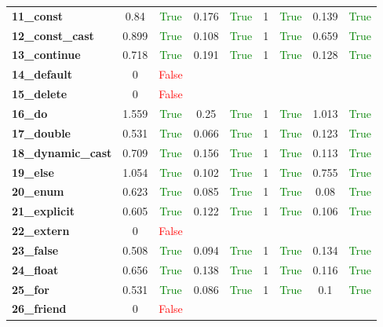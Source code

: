 \documentclass{article}
\begin{document}
\begin{xltabular}{\textwidth}{lcccccccc}
\textbf{11\_const}& 0.84&\textcolor{green}{True}& 0.176&\textcolor{green}{True}& 1&\textcolor{green}{True}& 0.139&\textcolor{green}{True} \\[0.5ex]
\textbf{12\_const\_cast}& 0.899&\textcolor{green}{True}& 0.108&\textcolor{green}{True}& 1&\textcolor{green}{True}& 0.659&\textcolor{green}{True} \\[0.5ex]
\textbf{13\_continue}& 0.718&\textcolor{green}{True}& 0.191&\textcolor{green}{True}& 1&\textcolor{green}{True}& 0.128&\textcolor{green}{True} \\[0.5ex]
\textbf{14\_default}& 0&\textcolor{red}{False} \\[0.5ex]
\textbf{15\_delete}& 0&\textcolor{red}{False} \\[0.5ex]
\textbf{16\_do}& 1.559&\textcolor{green}{True}& 0.25&\textcolor{green}{True}& 1&\textcolor{green}{True}& 1.013&\textcolor{green}{True} \\[0.5ex]
\textbf{17\_double}& 0.531&\textcolor{green}{True}& 0.066&\textcolor{green}{True}& 1&\textcolor{green}{True}& 0.123&\textcolor{green}{True} \\[0.5ex]
\textbf{18\_dynamic\_cast}& 0.709&\textcolor{green}{True}& 0.156&\textcolor{green}{True}& 1&\textcolor{green}{True}& 0.113&\textcolor{green}{True} \\[0.5ex]
\textbf{19\_else}& 1.054&\textcolor{green}{True}& 0.102&\textcolor{green}{True}& 1&\textcolor{green}{True}& 0.755&\textcolor{green}{True} \\[0.5ex]
\textbf{20\_enum}& 0.623&\textcolor{green}{True}& 0.085&\textcolor{green}{True}& 1&\textcolor{green}{True}& 0.08&\textcolor{green}{True} \\[0.5ex]
\textbf{21\_explicit}& 0.605&\textcolor{green}{True}& 0.122&\textcolor{green}{True}& 1&\textcolor{green}{True}& 0.106&\textcolor{green}{True} \\[0.5ex]
\textbf{22\_extern}& 0&\textcolor{red}{False} \\[0.5ex]
\textbf{23\_false}& 0.508&\textcolor{green}{True}& 0.094&\textcolor{green}{True}& 1&\textcolor{green}{True}& 0.134&\textcolor{green}{True} \\[0.5ex]
\textbf{24\_float}& 0.656&\textcolor{green}{True}& 0.138&\textcolor{green}{True}& 1&\textcolor{green}{True}& 0.116&\textcolor{green}{True} \\[0.5ex]
\textbf{25\_for}& 0.531&\textcolor{green}{True}& 0.086&\textcolor{green}{True}& 1&\textcolor{green}{True}& 0.1&\textcolor{green}{True} \\[0.5ex]
\textbf{26\_friend}& 0&\textcolor{red}{False} \\[0.5ex]

\end{xltabular}
\end{document}
